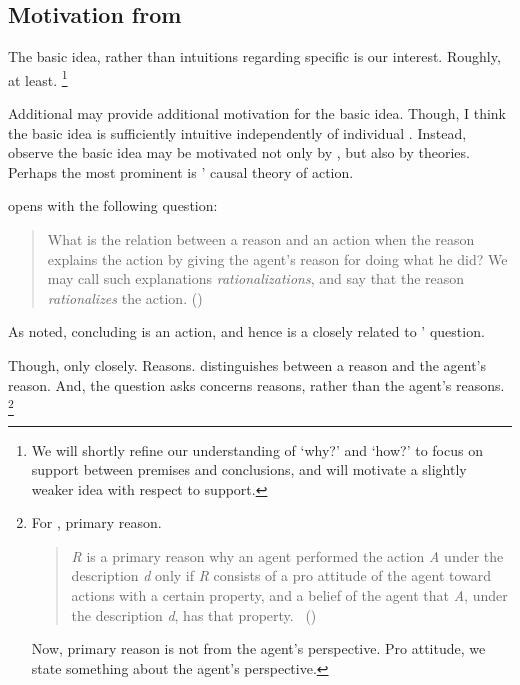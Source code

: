 \subsection{Motivation from \citeauthor{Davidson:1963aa}}

\begin{note}
  The basic idea, rather than intuitions regarding specific  is our interest.
  Roughly, at least.%
  \footnote{
    We will shortly refine our understanding of `why?' and `how?' to focus on support between premises and conclusions, and will motivate a slightly weaker idea with respect to support.
  }

  Additional  may provide additional motivation for the basic idea.
  Though, I think the basic idea is sufficiently intuitive independently of individual .
  Instead, observe the basic idea may be motivated not only by , but also by theories.
  Perhaps the most prominent is \citeauthor{Davidson:1963aa}' causal theory of action.

  \citeauthor{Davidson:1963aa} opens  with the following question:

  \begin{quote}
    What is the relation between a reason and an action when the reason explains the action by giving the agent's reason for doing what he did?
    We may call such explanations \emph{rationalizations}, and say that the reason \emph{rationalizes} the action.%
    \mbox{}\hfill\mbox{(\citeyear[685]{Davidson:1963aa})}
  \end{quote}

  As noted, concluding is an action, and hence \qWhy{} is a closely related to \citeauthor{Davidson:1963aa}' question.

  Though, only closely.
  Reasons.
  \citeauthor{Davidson:1963aa} distinguishes between a reason and the agent's reason.
  And, the question \citeauthor{Davidson:1963aa} asks concerns reasons, rather than the agent's reasons.%
  \footnote{
    For \citeauthor{Davidson:1963aa}, primary reason.

    \begin{quote}
      \emph{R} is a primary reason why an agent performed the action \emph{A} under the description \emph{d} only if \emph{R} consists of a pro attitude of the agent toward actions with a certain property, and a belief of the agent that \emph{A}, under the description \emph{d}, has that property.\newline
      \mbox{ }\hfill\mbox{(\citeyear[687]{Davidson:1963aa})}
    \end{quote}
    Now, primary reason is not from the agent's perspective.
    Pro attitude, we state something about the agent's perspective.
  }


\end{note}
